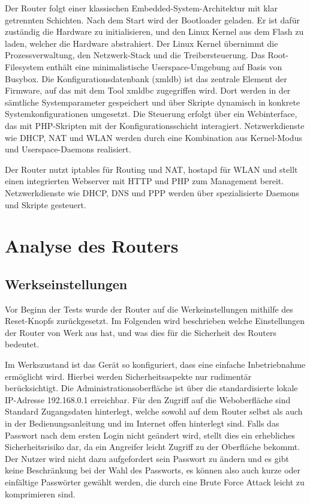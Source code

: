 	Der Router folgt einer klassischen Embedded-System-Architektur mit klar getrennten Schichten.
	Nach dem Start wird der Bootloader geladen. Er ist dafür zuständig die Hardware zu initialisieren, 
	und den Linux Kernel aus dem Flash zu laden, welcher die Hardware abstrahiert.
	Der Linux Kernel übernimmt die Prozessverwaltung, den Netzwerk-Stack und
	die Treibersteuerung. Das Root-Filesystem enthält
	eine minimalistische Userspace-Umgebung auf Basis von Busybox. 
	Die Konfigurationsdatenbank (xmldb) ist das zentrale Element der Firmware, auf das mit dem Tool
	xmldbc zugegriffen wird. Dort werden in der sämtliche Systemparameter gespeichert und über Skripte dynamisch in
	konkrete Systemkonfigurationen umgesetzt. Die Steuerung erfolgt über ein Webinterface, das mit PHP-Skripten
	mit der Konfigurationsschicht interagiert. Netzwerkdienste wie DHCP, NAT und WLAN werden durch eine
	Kombination aus Kernel-Modus und Userspace-Daemons realisiert.

	Der Router nutzt iptables für Routing und NAT, hostapd für WLAN und stellt einen integrierten Webserver
	mit HTTP und PHP zum Management bereit. Netzwerkdienste wie DHCP, DNS und PPP werden über spezialisierte Daemons und
	Skripte gesteuert. \cite{hostapdieee80211ab, netfilteriptablesprojectb, dlinksupportresourcesb}

	\section{Analyse des Routers}
	\label{sec:Analyse des Routers}

	\subsection{Werkseinstellungen}
	\label{sec:Werkseinstellungen}
	Vor Beginn der Tests wurde der Router auf die Werkeinstellungen mithilfe des Reset-Knopfs zurückgesetzt.
	Im Folgenden wird beschrieben welche Einstellungen der Router von Werk aus hat, und was dies für
	die Sicherheit des Routers bedeutet.
	
	Im Werkszustand ist das Gerät so konfiguriert, dass eine einfache Inbetriebnahme ermöglicht wird.
	Hierbei werden Sicherheitsaspekte nur rudimentär berücksichtigt. 
	Die Administrationsoberfläche ist über die standardisierte lokale IP-Adresse 192.168.0.1 erreichbar.
	Für den Zugriff auf die Weboberfläche sind Standard Zugangsdaten hinterlegt, welche sowohl auf dem Router
	selbst als auch in der Bedienungsanleitung und im Internet offen hinterlegt sind.
	Falls das Passwort nach dem ersten Login nicht geändert wird, stellt dies ein erhebliches Sicherheitsrisiko dar,
	da ein Angreifer leicht Zugriff zu der Oberfläche bekommt. Der Nutzer wird nicht dazu aufgefordert sein Passwort
	zu ändern und es gibt keine Beschränkung bei der Wahl des Passworts, es können also auch kurze oder einfältige
	Passwörter gewählt werden, die durch eine Brute Force Attack leicht zu komprimieren sind.

